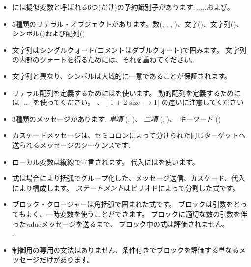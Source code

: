 \documentclass[a4paper,10pt,twoside]{book}
\begin{document}
\begin{itemize}

\item	\pharo には擬似変数と呼ばれる6つ(だけ)の予約識別子があります: ,,,,,および。

\item	5種類のリテラル・オブジェクトがあります。数(, , , )、文字()、文字列()、シンボル()および配列()

\item	文字列はシングルクォート(コメントはダブルクォート)で囲みます。
		文字列の内部のクォートを得るためには、それを重ねてください。

\item	文字列と異なり、シンボルは大域的に一意であることが保証されます。

\item	リテラル配列を定義するためにはを使います。
		動的配列を定義するためには\ct|{ ... }|を使ってください。
		、
		\ct|{ 1 + 2 } size -→ 1|
		の違いに注意してください

\item	3種類のメッセージがあります:
		\emph{単項} (\eg {}, )、
		\emph{二項} (\eg {}, )、
		\emph{キーワード} (\eg {})

\item	カスケードメッセージは、セミコロンによって分けられた同じターゲットへ送られるメッセージのシーケンスです.

\item	ローカル変数は縦線で宣言されます。
		代入には\ct{:=}を使います。

\item	式は場合により括弧でグループ化した、メッセージ送信、カスケード、代入により構成します。
		\emph{ステートメント}はピリオドによって分割した式です。

\item	ブロック・クロージャーは角括弧で囲まれた式です。
		ブロックは引数をとってもよく、一時変数を使うことができます。
		ブロックに適切な数の引数を伴ったvalueメッセージを送るまで、
		ブロック中の式は評価されません。\\
		.

\item	制御用の専用の文法はありません、条件付きでブロックを評価する単なるメッセージだけがあります。

\end{itemize}

\ifx\wholebook\relax\else
\end{document}
